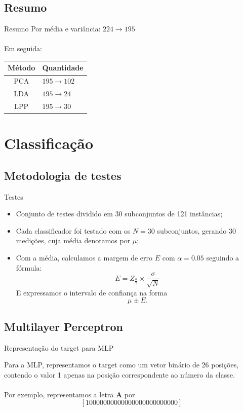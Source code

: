\subsection[Resumo]{Resumo}
\begin{frame}{Resumo}
	Por média e variância: $224 \to 195$\\~\\
	Em seguida:\\
	\begin{center}
	\begin{tabular}{c | l}
		Método 		& Quantidade		\\
		\hline
		PCA 		& $195 \to 102$		\\
		LDA 		& $195 \to 24$ 		\\
		LPP 		& $195 \to 30$ 		\\ 
	\end{tabular}
	\end{center}
\end{frame}


\section[Classificação]{Classificação}

\subsection[Metodologia de testes]{Metodologia de testes}
\begin{frame}{Testes}
	\begin{itemize}
		\item Conjunto de testes dividido em 30 subconjuntos de 121 instâncias;
		\item Cada classificador foi testado com os $N = 30$ subconjuntos, gerando
		      30 medições, cuja média denotamos por $\mu$;
		\item Com a média, calculamos a margem de erro $E$ com $\alpha = 0.05$ seguindo a fórmula:
		      $$E= Z_{\frac{\alpha}{2}}\times\frac{\sigma}{\sqrt{N}}$$	
		      E expressamos o intervalo de confiança na forma
		      $$\mu \pm E.$$
	\end{itemize}
\end{frame}

\subsection[MLP]{Multilayer Perceptron}

\begin{frame}{Representação do target para MLP}

Para a MLP, representamos o target como um vetor binário
de 26 posições, contendo o valor 1 apenas na posição
correspondente ao número da classe.\\~\\

Por exemplo, representamos a letra \textbf{A} por
$$[1 0 0 0 0 0 0 0 0 0 0 0 0 0 0 0 0 0 0 0 0 0 0 0 0 0]$$

\end{frame}

